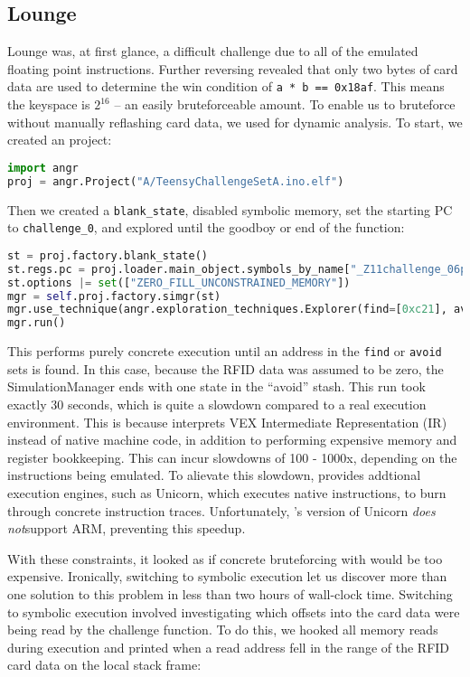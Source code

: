 \subsection{Lounge}
\label{sec:lounge}
Lounge was, at first glance, a difficult challenge due to all of the emulated floating point instructions. Further reversing revealed that only two bytes of card data are used to determine the win condition of \texttt{a * b == 0x18af}. This means the keyspace is $2^{16}$ -- an easily bruteforceable amount. To enable us to bruteforce without manually reflashing card data, we used \angr for dynamic analysis. To start, we created an \angr project:

\begin{lstlisting}[language=python]
import angr
proj = angr.Project("A/TeensyChallengeSetA.ino.elf")
\end{lstlisting}

Then we created a \texttt{blank\_state}, disabled symbolic memory, set the starting PC to \texttt{challenge\_0}, and explored until the goodboy or end of the function:

\begin{lstlisting}[language=python]
st = proj.factory.blank_state()
st.regs.pc = proj.loader.main_object.symbols_by_name["_Z11challenge_06packet"].linked_addr
st.options |= set(["ZERO_FILL_UNCONSTRAINED_MEMORY"])
mgr = self.proj.factory.simgr(st)
mgr.use_technique(angr.exploration_techniques.Explorer(find=[0xc21], avoid=[0xc51]))
mgr.run()
\end{lstlisting}

This performs purely concrete execution until an address in the \texttt{find}
or \texttt{avoid} sets is found. In this case, because the RFID data was
assumed to be zero, the SimulationManager ends with one state in the ``avoid'' stash.
This run took exactly 30 seconds, which is quite a slowdown compared to a real
execution environment. This is because \angr interprets VEX Intermediate
Representation (IR) instead of native machine code, in addition to performing
expensive memory and register bookkeeping. This can incur slowdowns of 100 -
1000x, depending on the instructions being emulated. To alievate this slowdown,
\angr provides addtional execution engines, such as Unicorn\needref, which
executes native instructions, to burn through concrete instruction traces.
Unfortunately, \angr's version of Unicorn \emph{does not}\needref support ARM,
preventing this speedup.

With these constraints, it looked as if concrete bruteforcing with \angr would be too expensive. Ironically, switching to symbolic execution let us discover more than one solution to this problem in less than two hours of wall-clock time. Switching to symbolic execution involved investigating which offsets into the card data were being read by the challenge function. To do this, we hooked all memory reads during execution and printed when a read address fell in the range of the RFID card data on the local stack frame:

